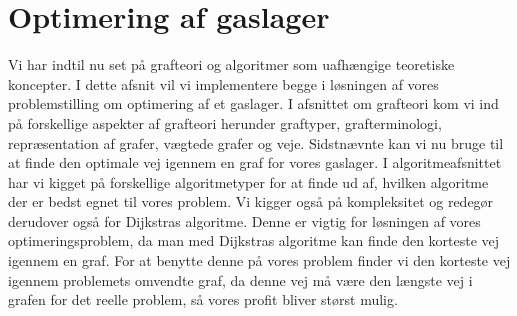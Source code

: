 \chapter{Optimering af gaslager}
Vi har indtil nu set på grafteori og algoritmer som  uafhængige teoretiske koncepter. I dette afsnit vil vi implementere begge i løsningen af vores problemstilling om optimering af et gaslager. I afsnittet om grafteori kom vi ind på forskellige aspekter af grafteori herunder graftyper, grafterminologi, repræsentation af grafer, vægtede grafer og veje. Sidstnævnte kan vi nu bruge til at finde den optimale vej igennem en graf for vores gaslager. I algoritmeafsnittet har vi kigget på forskellige algoritmetyper for at finde ud af, hvilken algoritme der er bedst egnet til vores problem. Vi kigger også på kompleksitet og redegør derudover også for Dijkstras algoritme. Denne er vigtig for løsningen af vores optimeringsproblem, da man med Dijkstras algoritme kan finde den korteste vej igennem en graf. For at benytte denne på vores problem finder vi den korteste vej igennem problemets omvendte graf, da denne vej må være den længste vej i grafen for det reelle problem, så vores profit bliver størst mulig.



















